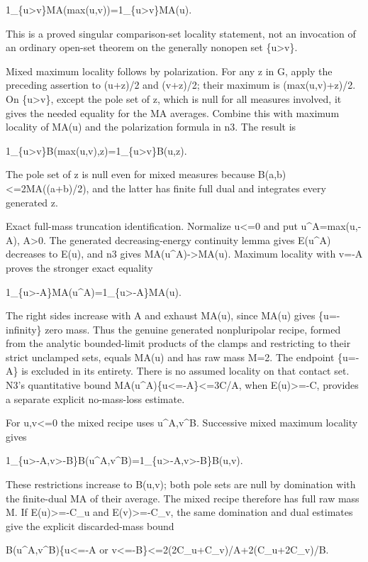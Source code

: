 \documentclass[11pt]{article}
\begin{document}
1\_\{u>v\}MA(max(u,v))=1\_\{u>v\}MA(u).

This is a proved singular comparison-set locality statement, not an invocation of an ordinary open-set theorem on the generally nonopen set \{u>v\}.

Mixed maximum locality follows by polarization. For any z in G, apply the preceding assertion to (u+z)/2 and (v+z)/2; their maximum is (max(u,v)+z)/2. On \{u>v\}, except the pole set of z, which is null for all measures involved, it gives the needed equality for the MA averages. Combine this with maximum locality of MA(u) and the polarization formula in n3. The result is

1\_\{u>v\}B(max(u,v),z)=1\_\{u>v\}B(u,z).

The pole set of z is null even for mixed measures because B(a,b)<=2MA((a+b)/2), and the latter has finite full dual and integrates every generated z.

Exact full-mass truncation identification. Normalize u<=0 and put u\textasciicircum{}A=max(u,-A), A>0. The generated decreasing-energy continuity lemma gives E(u\textasciicircum{}A) decreases to E(u), and n3 gives MA(u\textasciicircum{}A)->MA(u). Maximum locality with v=-A proves the stronger exact equality

1\_\{u>-A\}MA(u\textasciicircum{}A)=1\_\{u>-A\}MA(u).

The right sides increase with A and exhaust MA(u), since MA(u) gives \{u=-infinity\} zero mass. Thus the genuine generated nonpluripolar recipe, formed from the analytic bounded-limit products of the clamps and restricting to their strict unclamped sets, equals MA(u) and has raw mass M=2. The endpoint \{u=-A\} is excluded in its entirety. There is no assumed locality on that contact set. N3's quantitative bound MA(u\textasciicircum{}A)\{u<=-A\}<=3C/A, when E(u)>=-C, provides a separate explicit no-mass-loss estimate.

For u,v<=0 the mixed recipe uses u\textasciicircum{}A,v\textasciicircum{}B. Successive mixed maximum locality gives

1\_\{u>-A,v>-B\}B(u\textasciicircum{}A,v\textasciicircum{}B)=1\_\{u>-A,v>-B\}B(u,v).

These restrictions increase to B(u,v); both pole sets are null by domination with the finite-dual MA of their average. The mixed recipe therefore has full raw mass M. If E(u)>=-C\_u and E(v)>=-C\_v, the same domination and dual estimates give the explicit discarded-mass bound

B(u\textasciicircum{}A,v\textasciicircum{}B)\{u<=-A or v<=-B\}<=2(2C\_u+C\_v)/A+2(C\_u+2C\_v)/B.
\end{document}
